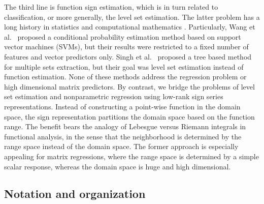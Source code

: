 \documentclass[aos]{imsart}
\theoremstyle{definition}
\begin{document}
The third line is function sign estimation, which is in turn related to classification, or more generally, the level set estimation. The latter problem has a long history in statistics \citep{tsybakov1997nonparametric} and computational mathematics \citep{gibou2018review}. Particularly, Wang et al.~\cite{wang2008probability} proposed a conditional probability estimation method based on support vector machines (SVMs), but their results were restricted to a fixed number of features and vector predictors only. Singh et al.~\cite{singh2009adaptive} proposed a tree based method for multiple sets extraction, but their goal was level set estimation instead of function estimation. None of these methods address the regression problem or high dimensional matrix predictors. By contrast, we bridge the problems of level set estimation and nonparametric regression using low-rank sign series representations. Instead of constructing a point-wise function in the domain space, the sign representation partitions the domain space based on the function range. The benefit bears the analogy of Lebesgue versus Riemann integrals in functional analysis, in the sense that the neighborhood is determined by the range space instead of the domain space. The former approach is especially appealing for matrix regressions, where the range space is determined by a simple scalar response, whereas the domain space is huge and high dimensional. 



\subsection{Notation and organization}
\end{document}
